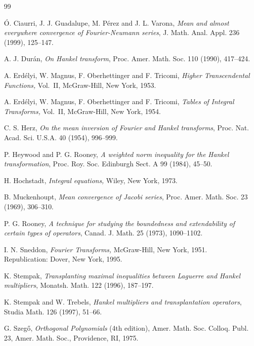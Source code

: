 \documentclass[12pt,leqno]{amsart}
\theoremstyle{plain}
\begin{document}

\begin{thebibliography}{99}

 \'O. Ciaurri, J. J. Guadalupe, M. P\'erez and J. L. Varona,
\textit{Mean and almost everywhere convergence of Fourier-Neumann series},
{J. Math. Anal. Appl.}
{236} (1999), 125--147.
 
 A. J. Dur\'an,
\textit{On Hankel transform},
{Proc. Amer. Math. Soc.}
{110} (1990), 417--424.

 A. Erd\'elyi, W. Magnus, F. Oberhettinger and F. Tricomi,
\textit{Higher Transcendental Functions,} Vol.~II,
McGraw-Hill, New York, 1953.

 A. Erd\'elyi, W. Magnus, F. Oberhettinger and F. Tricomi,
\textit{Tables of Integral Transforms,} Vol.~II,
McGraw-Hill, New York, 1954.

 C. S. Herz,
\textit{On the mean inversion of Fourier and Hankel transforms},
{Proc. Nat. Acad. Sci. U.S.A.}
{40} (1954), 996--999.

 P. Heywood and P. G. Rooney,
\textit{A weighted norm inequality for the Hankel transformation},
{Proc. Roy. Soc. Edinburgh Sect. A}
{99} (1984), 45--50.

 H. Hochstadt,
\textit{Integral equations,}
Wiley, New York, 1973.

 B. Muckenhoupt,
\textit{Mean convergence of Jacobi series},
{Proc. Amer. Math. Soc.}
{23} (1969), 306--310.

 P. G. Rooney,
\textit{A technique for studying the boundedness and extendability of certain
types of operators},
{Canad. J. Math.}
{25} (1973), 1090--1102.

 I. N. Sneddon,
\textit{Fourier Transforms,}
McGraw-Hill, New York, 1951.
Republication: Dover, New York, 1995.

 K. Stempak,
\textit{Transplanting maximal inequalities between Laguerre and Hankel
multipliers},
{Monatsh. Math.}
{122} (1996), 187--197.

 K. Stempak and W. Trebels,
\textit{Hankel multipliers and transplantation operators},
{Studia Math.}
{126} (1997), 51--66.

 G. Szeg\H{o},
\textit{Orthogonal Polynomials} (4th edition),
Amer. Math. Soc. Colloq. Publ.
{23}, Amer. Math. Soc.,
Providence, RI, 1975.


\end{thebibliography}
\end{document}

